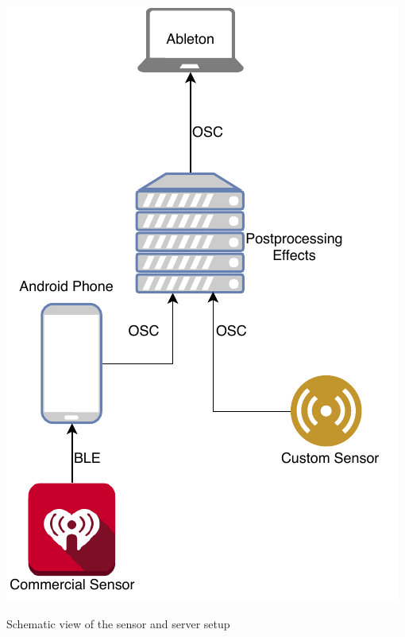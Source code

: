 \documentclass{sigchi-ext}
\begin{document}
\begin{marginfigure}[-24pc]
  \begin{minipage}{\marginparwidth}
    \centering
    \includegraphics[width=0.9\marginparwidth]{figures/topology}
    \caption{Schematic view of the sensor and server setup}
    \label{fig:setup}
  \end{minipage}
\end{marginfigure}
\end{document}
